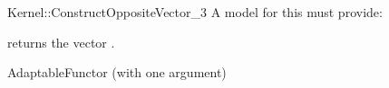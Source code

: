 \begin{ccRefFunctionObjectConcept}{Kernel::ConstructOppositeVector_3}
A model for this must provide:


{returns the vector .}

\ccRefines
AdaptableFunctor (with one argument)

\ccSeeAlso
{}  \\

\end{ccRefFunctionObjectConcept}
